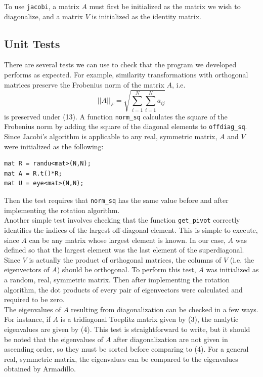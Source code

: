\documentclass[prb,aps,twocolumn,showpacs,10pt]{revtex4-1}
\begin{document}
To use \texttt{jacobi}, a matrix $A$ must first be initialized as the matrix we wish to diagonalize, and a matrix $V$ is initialized as the identity matrix.


\subsection{Unit Tests}

There are several tests we can use to check that the program we developed performs as expected. For example, similarity transformations with orthogonal matrices preserve the Frobenius norm of the matrix $A$, i.e.
\begin{equation}
||A||_F = \sqrt{\sum_{i=1}^N \sum_{i=1}^N a_{ij}}
\end{equation}
is preserved under (13). A function \texttt{norm\_sq} calculates the square of the Frobenius norm by adding the square of the diagonal elements to \texttt{offdiag\_sq}. Since Jacobi's algorithm is applicable to any real, symmetric matrix, $A$ and $V$ were initialized as the following:
\begin{lstlisting}
mat R = randu<mat>(N,N);
mat A = R.t()*R;
mat U = eye<mat>(N,N);
\end{lstlisting}
Then the test requires that \texttt{norm\_sq} has the same value before and after implementing the rotation algorithm.\\

Another simple test involves checking that the function \texttt{get\_pivot} correctly identifies the indices of the largest off-diagonal element. This is simple to execute, since $A$ can be any matrix whose largest element is known. In our case, $A$ was defined so that the largest element was the last element of the superdiagonal.\\

Since $V$ is actually the product of orthogonal matrices, the columns of $V$ (i.e. the eigenvectors of $A$) should be orthogonal. To perform this test, $A$ was initialized as a random, real, symmetric matrix. Then after implementing the rotation algorithm, the dot products of every pair of eigenvectors were calculated and required to be zero. \\

The eigenvalues of $A$ resulting from diagonalization can be checked in a few ways. For instance, if $A$ is a tridiagonal Toeplitz matrix given by (3), the analytic eigenvalues are given by (4). This test is straightforward to write, but it should be noted that the eigenvalues of $A$ after diagonalization are not given in ascending order, so they must be sorted before comparing to (4). For a general real, symmetric matrix, the eigenvalues can be compared to the eigenvalues obtained by Armadillo. 
\end{document}
